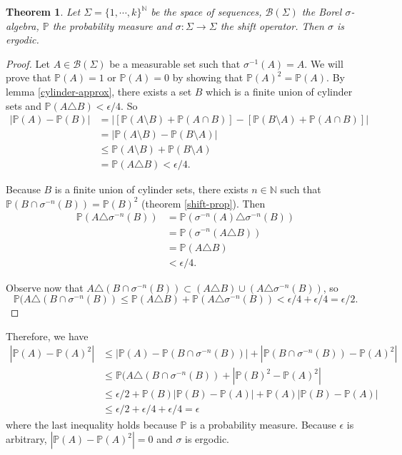 \documentclass[a4paper]{article}
\theoremstyle{plain}
\newtheorem{theorem}{Theorem}[section] %
\theoremstyle{definition}
\newcommand{\PP}{\mathbb{P}}
\begin{document}
\begin{theorem}\label{ergodic-shift}
    Let $\Sigma=\{1, \cdots, k\}^\mathbb N$ be the space of sequences, $\mathcal B(\Sigma)$  the Borel $\sigma$-algebra, $\PP$ the probability measure and $\sigma:\Sigma\to\Sigma$ the shift operator. Then $\sigma$ is ergodic.
\end{theorem}
\begin{proof}
    Let $A\in\mathcal B(\Sigma)$ be a measurable set such that $\sigma^{-1}(A)=A$. We will prove that $\PP(A)=1$ or $\PP(A)=0$ by showing that $\PP(A)^2=\PP(A)$. By lemma \ref{cylinder-approx}, there exists a set $B$ which is a finite union of cylinder sets and $\PP(A\triangle B)<\epsilon/4.$ So
    \begin{align*}
        |\PP(A)-\PP(B)| &= |[\PP(A\setminus B)+\PP(A\cap B)]-[\PP(B\setminus A)+\PP(A\cap B)]|\\
        &=|\PP(A\setminus B)-\PP(B\setminus A)|\\
        &\leq \PP(A\setminus B) + \PP(B\setminus A)\\
        &= \PP(A\triangle B) <\epsilon/4.
    \end{align*}

Because $B$ is a finite union of cylinder sets, there exists $n\in\mathbb N$ such that $\PP(B\cap \sigma^{-n}(B))= \PP(B)^2$ (theorem \ref{shift-prop}). Then
\begin{align*}
    \PP(A\triangle \sigma^{-n}(B))&=\PP(\sigma^{-n}(A)\triangle\sigma^{-n}(B))\\
    &=\PP(\sigma^{-n}(A\triangle B))\\
    &=\PP(A\triangle B)\\
    &<\epsilon/4.
\end{align*}

Observe now that $A\triangle(B\cap\sigma^{-n}(B))\subset (A\triangle B)\cup(A\triangle\sigma^{-n}(B))$, so $$\PP(A\triangle(B\cap\sigma^{-n}(B))\leq \PP(A\triangle B)+\PP(A\triangle\sigma^{-n}(B))<\epsilon/4+\epsilon/4=\epsilon/2.$$
\end{proof}

Therefore, we have
\begin{align*}
    |\PP(A)-\PP(A)^2|&\leq |\PP(A)-\PP(B\cap \sigma^{-n}(B))|+|\PP(B\cap \sigma^{-n}(B))-\PP(A)^2|\\
    &\leq \PP(A\triangle(B\cap\sigma^{-n}(B))+|\PP(B)^2-\PP(A)^2|\\
    &\leq\epsilon/2 + \PP(B)|\PP(B)-\PP(A)| + \PP(A)|\PP(B)-\PP(A)|\\
    &\leq \epsilon/2+\epsilon/4+\epsilon/4 = \epsilon
\end{align*}
where the last inequality holds because $\PP$ is a probability measure. Because $\epsilon$ is arbitrary, $|\PP(A)-\PP(A)^2|=0$ and $\sigma$ is ergodic.
\end{document}
